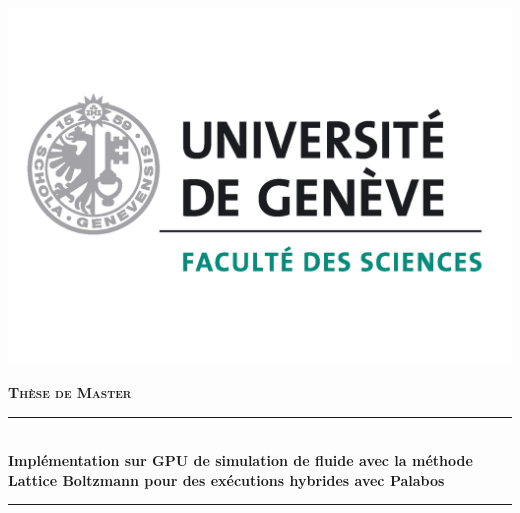 \newcommand{\HRule}{\rule{\linewidth}{0.5mm}}

\begin{titlepage}
\begin{minipage}{1\textwidth}
	\vspace{-1cm}
	\hspace{-0.048\textwidth}  %
\includegraphics[scale=0.2]{images/logo_uni_sciences.pdf}

	\hspace{0.316\textwidth}
\end{minipage}
\begin{center}



\textsc{\LARGE \textbf{Thèse de Master}}\\[0.5cm]


\HRule \\[0.4cm]
{ 
\Large \textbf{Implémentation sur \textsc{GPU} de simulation de fluide avec la méthode Lattice Boltzmann pour des exécutions hybrides avec Palabos}
}\\[0.4cm]

\HRule \\[0.8cm]


\end{center}
\end{titlepage}
